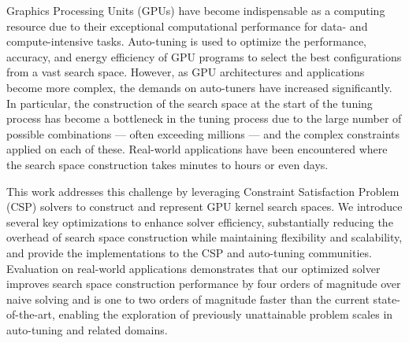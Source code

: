 Graphics Processing Units (GPUs) have become indispensable as a computing resource due to their exceptional computational performance for data- and compute-intensive tasks.
Auto-tuning is used to optimize the performance, accuracy, and energy efficiency of GPU programs to select the best configurations from a vast search space. 
However, as GPU architectures and applications become more complex, the demands on auto-tuners have increased significantly.
In particular, the construction of the search space at the start of the tuning process has become a bottleneck in the tuning process due to the large number of possible combinations — often exceeding millions — and the complex constraints applied on each of these. Real-world applications have been encountered where the search space construction takes minutes to hours or even days. 

This work addresses this challenge by leveraging Constraint Satisfaction Problem (CSP) solvers to construct and represent GPU kernel search spaces. 
We introduce several key optimizations to enhance solver efficiency, substantially reducing the overhead of search space construction while maintaining flexibility and scalability, and provide the implementations to the CSP and auto-tuning communities. 
Evaluation on real-world applications demonstrates that our optimized solver improves search space construction performance by four orders of magnitude over naive solving and is one to two orders of magnitude faster than the current state-of-the-art, enabling the exploration of previously unattainable problem scales in auto-tuning and related domains. 